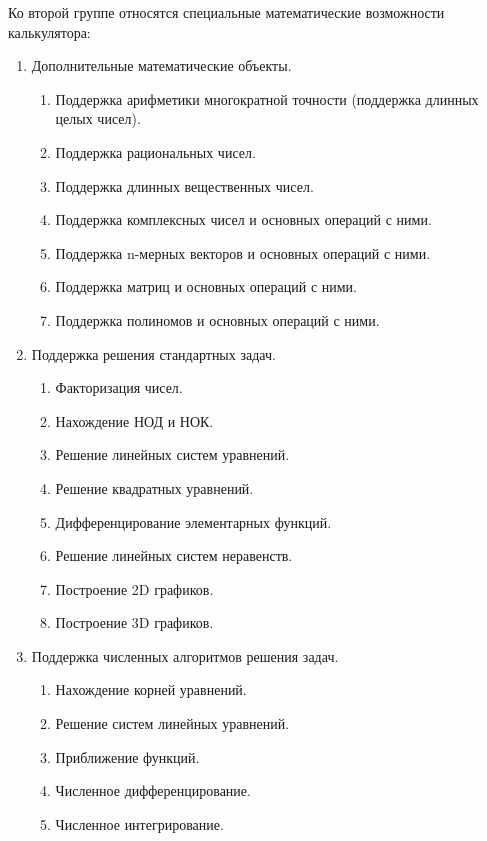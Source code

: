 Ко второй группе относятся специальные математические 
возможности калькулятора:
\begin{enumerate}
  \item Дополнительные математические объекты.
  \begin{enumerate}
     \item Поддержка арифметики многократной точности
           (поддержка длинных целых чисел).

     \item Поддержка рациональных чисел.

     \item Поддержка длинных вещественных чисел.

     \item Поддержка комплексных чисел и основных операций с ними.

     \item Поддержка n-мерных векторов и
           основных операций с ними.

     \item Поддержка матриц и основных операций с ними.

     \item Поддержка полиномов и основных операций с ними.
  \end{enumerate}


  \item Поддержка решения стандартных задач.
  \begin{enumerate}
     \item Факторизация чисел.

     \item Нахождение НОД и НОК.

     \item Решение линейных систем уравнений.

     \item Решение квадратных уравнений.

     \item Дифференцирование элементарных функций.

     \item Решение линейных систем неравенств.

     \item Построение 2D графиков.

     \item Построение 3D графиков.
  \end{enumerate}

  \item Поддержка численных алгоритмов решения задач.
  \begin{enumerate}
     \item Нахождение корней уравнений.

     \item Решение систем линейных уравнений.

     \item Приближение функций.

     \item Численное дифференцирование.

     \item Численное интегрирование.
  \end{enumerate}

\end{enumerate}

\endinput
